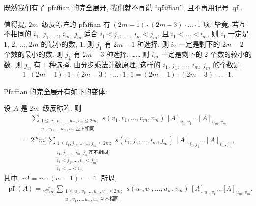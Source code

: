 \documentclass[../libro]{subfiles}
\begin{document}
既然我们有了 pfaffian 的完全展开,
我们就不再说 ``qfaffian'',
且不再用记号 \(\operatorname{qf}\).

值得提, \(2m\)~级反称阵的 pfaffian 有
\((2m-1) \cdot (2m-3) \cdot \dots \cdot 1\) 项.
毕竟, 若互不相同的
\(i_1\), \(j_1\), \(\dots\), \(i_m\), \(j_m\)
适合
\(i_1 < j_1\), \(\dots\), \(i_m < j_m\),
且 \(i_1 < \dots < i_m\),
则 \(i_1\) 一定是 \(1\), \(2\), \(\dots\), \(2m\) 的最小的数, \(1\).
则 \(j_1\) 有 \(2m-1\) 种选择.
则 \(i_2\) 一定是剩下的 \(2m-2\) 个数的最小的数.
则 \(j_2\) 有 \(2m-3\) 种选择.
……
则 \(i_m\) 一定是剩下的 \(2\) 个数的较小的数.
则 \(j_m\) 有 \(1\) 种选择.
由分步乘法计数原理, 这样的
\(i_1\), \(j_1\), \(\dots\), \(i_m\), \(j_m\)
的个数是
\begin{align*}
    1 \cdot (2m-1) \cdot 1 \cdot (2m-3) \cdot \dots \cdot
    1 \cdot 1
    = (2m-1) \cdot (2m-3) \cdot \dots \cdot 1.
\end{align*}

Pfaffian 的完全展开有如下的变体:

\begin{theorem}
    设 \(A\) 是 \(2m\)~级反称阵.
    则
    \begin{align*}
             &
        \sum_{\substack{
        1 \leq u_1, v_1, \dots, u_m, v_m \leq 2m; \\
                u_1, v_1, \dots, u_m, v_m\,\text{互不相同}
            }}
        {s(u_1, v_1, \dots, u_m, v_m)\,
            [A]_{u_1,v_1} \dots [A]_{u_m,v_m}}
        \\
        = {} &
        2^m m!
        \sum_{\substack{
        1 \leq i_1, j_1, \dots, i_m, j_m \leq 2m; \\
        i_1, j_1, \dots, i_m, j_m\,\text{互不相同};   \\
        i_1 < j_1, \dots, i_m < j_m;              \\
                i_1 < \dots < i_m
            }}
        {s(i_1, j_1, \dots, i_m, j_m)\,
            [A]_{i_1,j_1} \dots [A]_{i_m,j_m}},
    \end{align*}
    其中,
    \(m! = m \cdot (m-1) \cdot \dots \cdot 1\).
    所以,
    \begin{align*}
        \operatorname{pf} {(A)} =
        \frac{1}{2^m m!}
        \sum_{\substack{
        1 \leq u_1, v_1, \dots, u_m, v_m \leq 2m; \\
                u_1, v_1, \dots, u_m, v_m\,\text{互不相同}
            }}
        {s(u_1, v_1, \dots, u_m, v_m)\,
            [A]_{u_1,v_1} \dots [A]_{u_m,v_m}}.
    \end{align*}
\end{theorem}
\end{document}
